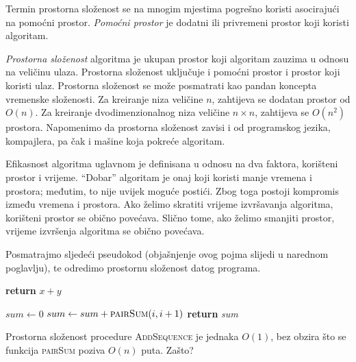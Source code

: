  Termin prostorna složenost se na mnogim mjestima pogrešno koristi asocira\-jući na pomoćni prostor.  \textit{Pomoćni prostor} je dodatni ili privremeni prostor koji koristi algoritam.
 
 \textit{Prostorna složenost} algoritma je ukupan prostor koji algoritam zauzima u odnosu na veličinu ulaza. Prostorna složenost   uključuje i pomoćni prostor i prostor koji koristi ulaz.  Prostorna složenost se može posmatrati kao pandan koncepta vremenske složenosti. Za kreiranje niza veličine $n$, zahtijeva se dodatan prostor od $O(n)$. Za kreiranje dvodimenzionalnog niza veličine $n \times n$,  zahtijeva se $O(n^2)$ prostora.
 Napomenimo da prostorna složenost zavisi i od programskog jezika, kompajlera, pa  čak i mašine koja pokreće algoritam.
 
 
 Efikasnost algoritma uglavnom je definisana u odnosu na  dva faktora, korišteni prostor i vrijeme. ``Dobar'' algoritam je onaj koji koristi manje vremena i prostora; međutim, to nije uvijek moguće postići. Zbog toga postoji kompromis između vremena i prostora. Ako želimo skratiti vrijeme izvršavanja algoritma, korišteni prostor se obično povećava. Slično tome, ako želimo smanjiti prostor, vrijeme izvršenja algoritma se obično povećava. %
 
 
 \begin{example}
 	Posmatrajmo sljedeći pseudokod (objašnjenje ovog pojma slijedi u narednom poglavlju), te odredimo prostornu složenost datog 
 	programa. 
 	
 	
 	\begin{algorithm}[H]
 		\begin{algorithmic}[1]
 			\State	\textbf{return} $x+y$
 			\EndProcedure
 			
 		\end{algorithmic}
 	\end{algorithm}        
 	
 	
 	\begin{algorithm}[H]
 		\begin{algorithmic}[1]
 			
 			\State $sum \gets 0$
 			\State $sum \gets sum + \textsc{pairSum}(i, i+1)$
 			\EndFor
 			\State \textbf{return} \textit{sum}~
 			\EndProcedure
 			
 		\end{algorithmic}
 	\end{algorithm}
 	
 	Prostorna složenost procedure \textsc{AddSequence} je jednaka $O(1)$, bez obzira što se funkcija \textsc{pairSum} poziva $O(n)$ puta. Zašto?
 	
 	
 \end{example}
 
